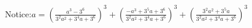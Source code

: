 \documentclass[preview]{standalone}
\begin{document}
\begin{center}
Notice:$a = \left( \frac{a^3 - 3^6}{3^2a^2 + 3^4a + 3^6} \right)^3 + \left( \frac{-a^3 + 3^5a + 3^6}{3^2a^2 + 3^4a + 3^6} \right)^3 + \left( \frac{3^2a^2 + 3^5a}{3^2a^2 + 3^4a + 3^6} \right)^3$
\end{center}
\end{document}
